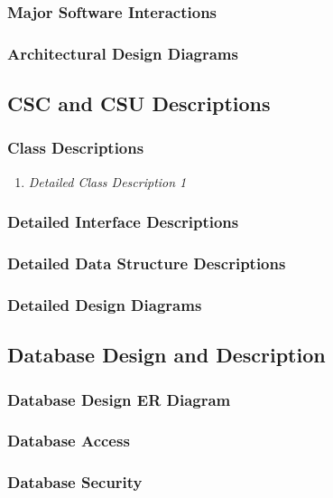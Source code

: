 \documentclass{article}
\begin{document}
\subsubsection{Major Software Interactions}
\label{msi}

\subsubsection{Architectural Design Diagrams}
\label{add}

\pagebreak
\subsection{CSC and CSU Descriptions}

\subsubsection{Class Descriptions}
\label{cd}

\begin{enumerate}
    \item[~\ref{cd}.1 ] \emph{Detailed Class Description 1}
\end{enumerate}

\subsubsection{Detailed Interface Descriptions}
\label{did}

\subsubsection{Detailed Data Structure Descriptions}
\label{ddsd}

\subsubsection{Detailed Design Diagrams}
\label{ddd}

\pagebreak
\subsection{Database Design and Description}

\subsubsection{Database Design ER Diagram}
\label{dded}

\subsubsection{Database Access}
\label{da}

\subsubsection{Database Security}
\label{ds}
\end{document}
